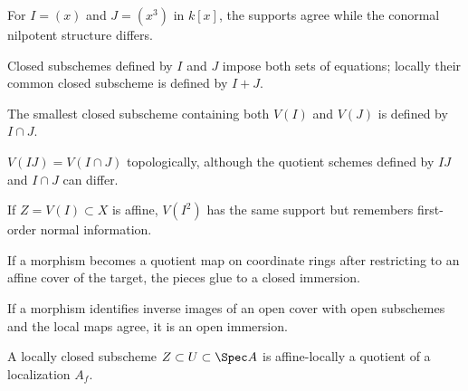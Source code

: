 \begin{example}\label{ex:vi22-ae01}
For $I=(x)$ and $J=(x^3)$ in $k[x]$, the supports agree while the conormal nilpotent structure differs.
\end{example}

\begin{example}\label{ex:vi22-ae02}
Closed subschemes defined by $I$ and $J$ impose both sets of equations; locally their common closed subscheme is defined by $I+J$.
\end{example}

\begin{example}\label{ex:vi22-ae03}
The smallest closed subscheme containing both $V(I)$ and $V(J)$ is defined by $I\cap J$.
\end{example}

\begin{example}\label{ex:vi22-ae04}
$V(IJ)=V(I\cap J)$ topologically, although the quotient schemes defined by $IJ$ and $I\cap J$ can differ.
\end{example}

\begin{example}\label{ex:vi22-ae05}
If $Z=V(I)\subset X$ is affine, $V(I^2)$ has the same support but remembers first-order normal information.
\end{example}

\begin{example}\label{ex:vi22-ae06}
If a morphism becomes a quotient map on coordinate rings after restricting to an affine cover of the target, the pieces glue to a closed immersion.
\end{example}

\begin{example}\label{ex:vi22-ae07}
If a morphism identifies inverse images of an open cover with open subschemes and the local maps agree, it is an open immersion.
\end{example}

\begin{example}\label{ex:vi22-ae08}
A locally closed subscheme $Z\subset U\subset\Spec A$ is affine-locally a quotient of a localization $A_f$.
\end{example}

